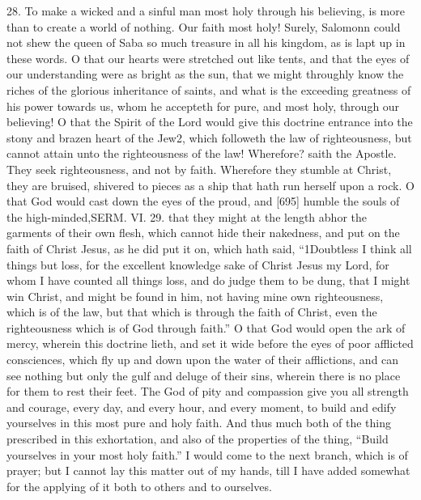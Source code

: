 28. To make a wicked and a sinful man most holy through his believing, is more than to create a world of nothing. Our faith most holy! Surely, Salomonn could not shew the queen of Saba so much treasure in all his kingdom, as is lapt up in these words. O that our hearts were stretched out like tents, and that the eyes of our understanding were as bright as the sun, that we might throughly know the riches of the glorious inheritance of saints, and what is the exceeding greatness of his power towards us, whom he accepteth for pure, and most holy, through our believing! O that the Spirit of the Lord would give this doctrine entrance into the stony and brazen heart of the Jew2, which followeth the law of righteousness, but cannot attain unto the righteousness of the law! Wherefore? saith the Apostle. They seek righteousness, and not by faith. Wherefore they stumble at Christ, they are bruised, shivered to pieces as a ship that hath run herself upon a rock. O that God would cast down the eyes of the proud, and [695] humble the souls of the high-minded,SERM. VI. 29. that they might at the length abhor the garments of their own flesh, which cannot hide their nakedness, and put on the faith of Christ Jesus, as he did put it on, which hath said, “1Doubtless I think all things but loss, for the excellent knowledge sake of Christ Jesus my Lord, for whom I have counted all things loss, and do judge them to be dung, that I might win Christ, and might be found in him, not having mine own righteousness, which is of the law, but that which is through the faith of Christ, even the righteousness which is of God through faith.” O that God would open the ark of mercy, wherein this doctrine lieth, and set it wide before the eyes of poor afflicted consciences, which fly up and down upon the water of their afflictions, and can see nothing but only the gulf and deluge of their sins, wherein there is no place for them to rest their feet. The God of pity and compassion give you all strength and courage, every day, and every hour, and every moment, to build and edify yourselves in this most pure and holy faith. And thus much both of the thing prescribed in this exhortation, and also of the properties of the thing, “Build yourselves in your most holy faith.” I would come to the next branch, which is of prayer; but I cannot lay this matter out of my hands, till I have added somewhat for the applying of it both to others and to ourselves.

